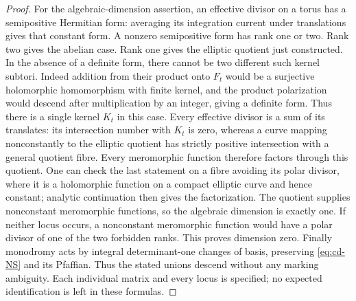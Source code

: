 \begin{proof}
For the algebraic-dimension assertion, an effective divisor on a torus
has a semipositive Hermitian form: averaging its integration current under
translations gives that constant form. A nonzero semipositive form has
rank one or two. Rank two gives the abelian case. Rank one gives the
elliptic quotient just constructed. In the absence of a definite form,
there cannot be two different such kernel subtori. Indeed addition from
their product onto $F_t$ would be a surjective holomorphic homomorphism
with finite kernel, and the product polarization would descend after
multiplication by an integer, giving a definite form. Thus there is a
single kernel $K_t$ in this case. Every effective divisor is a sum of
its translates: its intersection number with $K_t$ is zero, whereas a
curve mapping nonconstantly to the elliptic quotient has strictly positive
intersection with a general quotient fibre. Every meromorphic function
therefore factors through this quotient. One can check the last statement
on a fibre avoiding its polar divisor, where it is a holomorphic function
on a compact elliptic curve and hence constant; analytic continuation
then gives the factorization. The quotient supplies nonconstant
meromorphic functions, so the algebraic dimension is exactly one.
If neither locus occurs, a nonconstant meromorphic function would have
a polar divisor of one of the two forbidden ranks. This proves dimension
zero. Finally monodromy acts by integral determinant-one changes of basis,
preserving \eqref{eq:cd-NS} and its Pfaffian. Thus the stated unions descend
without any marking ambiguity. Each individual matrix and every locus
is specified; no expected identification is left in these formulas.
\end{proof}

